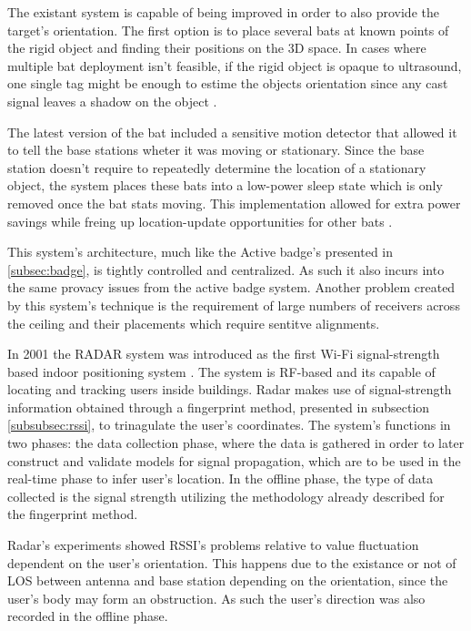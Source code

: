  The existant system is capable of being improved in order to also provide the target's orientation. The first option is to place several bats at known points of the rigid object and finding their positions on the 3D space. In cases where multiple bat deployment isn't feasible, if the rigid object is opaque to ultrasound, one single tag might be enough to estime the objects orientation since any cast signal leaves a shadow on the object \cite{bat1}.

The latest version of the bat included a sensitive motion detector that allowed it to tell the base stations wheter it was moving or stationary. Since the base station doesn't require to repeatedly determine the location of a stationary object, the system places these bats into a low-power sleep state which is only removed once the bat stats moving. This implementation allowed for extra power savings while freing up location-update opportunities for other bats \cite{bat2}.

This system's architecture, much like the Active badge's presented in \ref{subsec:badge}, is tightly controlled and centralized. As such it also incurs into the same provacy issues from the active badge system. Another problem created by this system's technique is the requirement of large numbers of receivers across the ceiling and their placements which require sentitve alignments.


\label{subsec:radar}

In 2001 the RADAR system was introduced as the first Wi-Fi signal-strength based indoor positioning system \cite{radar}. The system is \ac{RF}-based and its capable of locating and tracking users inside buildings. Radar makes use of signal-strength information obtained through a fingerprint method, presented in subsection \ref{subsubsec:rssi}, to trinagulate the user's coordinates. The system's functions in two phases: the data collection phase, where the data is gathered in order to later construct and validate models for signal propagation, which are to be used in the real-time phase to infer user's location. In the offline phase, the type of data collected is the signal strength utilizing the methodology already described for the fingerprint method.

Radar's experiments showed \ac{RSSI}'s problems relative to value fluctuation dependent on the user's orientation. This happens due to the existance or not of \ac{LOS} between antenna and base station depending on the orientation, since the user's body may form an obstruction. As such the user's direction was also recorded in the offline phase.

